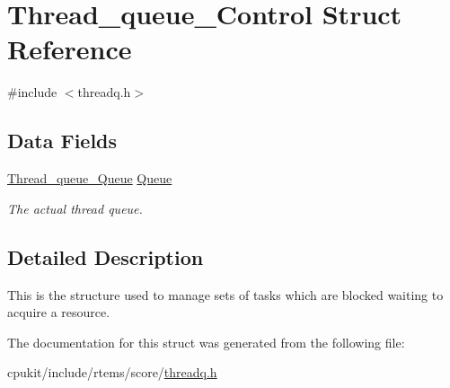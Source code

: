 \hypertarget{structThread__queue__Control}{}\section{Thread\+\_\+queue\+\_\+\+Control Struct Reference}
\label{structThread__queue__Control}


{\ttfamily \#include $<$threadq.\+h$>$}

\subsection*{Data Fields}
\begin{DoxyCompactItemize}
\item 
\mbox{\label{structThread__queue__Control_a68be3aa5fc8979ecf227aebec323907b}} 
\mbox{\hyperlink{structThread__queue__Queue}{Thread\+\_\+queue\+\_\+\+Queue}} \mbox{\hyperlink{structThread__queue__Control_a68be3aa5fc8979ecf227aebec323907b}{Queue}}
\begin{DoxyCompactList}\small\item\em The actual thread queue. \end{DoxyCompactList}\end{DoxyCompactItemize}


\subsection{Detailed Description}
This is the structure used to manage sets of tasks which are blocked waiting to acquire a resource. 

The documentation for this struct was generated from the following file\+:\begin{DoxyCompactItemize}
\item 
cpukit/include/rtems/score/\mbox{\hyperlink{threadq_8h}{threadq.\+h}}\end{DoxyCompactItemize}
